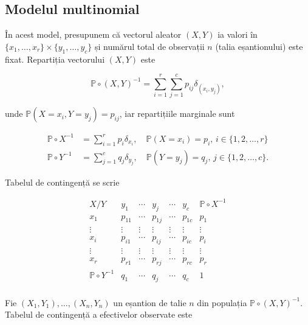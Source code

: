 \documentclass[]{article}
\begin{document}
\subsection{Modelul multinomial}\label{modelul-multinomial}

În acest model, presupunem că vectorul aleator \((X,Y)\) ia valori în
\(\{x_1,\ldots, x_r\}\times\{y_1,\ldots, y_c\}\) și numărul total de
observații \(n\) (talia eșantionului) este fixat. Repartiția vectorului
\((X,Y)\) este

\[
  \mathbb{P}\circ(X,Y)^{-1} = \sum_{i = 1}^{r}\sum_{j = 1}^{c}p_{ij}\delta_{(x_i,y_j)},
\]

unde \(\mathbb{P}(X = x_i, Y = y_j) = p_{ij}\), iar repartițiile
marginale sunt

\begin{align*}
  \mathbb{P}\circ X^{-1} &= \sum_{i = 1}^{r}p_i\delta_{x_i},\quad \mathbb{P}(X = x_i) = p_{i},\, i\in\{1,2,\ldots,r\} \\
  \mathbb{P}\circ Y^{-1} &= \sum_{j = 1}^{c}q_j\delta_{y_j},\quad \mathbb{P}(Y = y_j) = q_{j},\, j\in\{1,2,\ldots,c\}.
\end{align*}

Tabelul de contingență se scrie

\[
\begin{array}{c|ccccc|c}
  X / Y  &  y_1      & \cdots &  y_j     & \cdots &  y_c     & \mathbb{P}\circ X^{-1}\\
  \hline
  x_1      &  p_{11} & \cdots & p_{1j} & \cdots & p_{1c} & p_{1}\\
  \vdots & \vdots  & \vdots & \vdots & \vdots & \vdots & \vdots  \\
  x_i      &  p_{i1} & \cdots & p_{ij} & \cdots & p_{ic} & p_{i}\\
  \vdots & \vdots  & \vdots & \vdots & \vdots & \vdots & \vdots  \\
  x_r      &  p_{r1} & \cdots & p_{rj} & \cdots & p_{rc} & p_{r}\\
  \hline
  \mathbb{P}\circ Y^{-1}&  q_{1} & \cdots & q_{j} & \cdots & q_{c} & 1\\
\end{array}
\]

Fie \((X_1,Y_1), \ldots, (X_n,Y_n)\) un eșantion de talie \(n\) din
populația \(\mathbb{P}\circ(X,Y)^{-1}\). Tabelul de contingență a
efectivelor observate este
\end{document}
